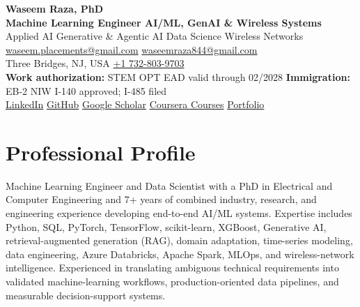 \documentclass[9pt,letterpaper]{extarticle}
\begin{document}
\begin{center}
{\LARGE\bfseries Waseem Raza, PhD}{\normalsize\mdseries }\\[2pt]
{\large\bfseries Machine Learning Engineer \textbar{} AI/ML, GenAI \& Wireless Systems}\\[1pt]
{\small Applied AI \textbar{} Generative \& Agentic AI \textbar{} Data Science \textbar{} Wireless Networks}\\[3pt]
{\footnotesize {}\enspace \href{mailto:waseem.placements@gmail.com}{waseem.placements@gmail.com} \textbar{} \href{mailto:waseemraza844@gmail.com}{waseemraza844@gmail.com}\\[1pt]Three Bridges, NJ, USA \quad {}\enspace \href{tel:+17328039703}{+1 732-803-9703}\\[1pt]{\scriptsize \textbf{Work authorization:} STEM OPT EAD valid through 02/2028 \textbar{} \textbf{Immigration:} EB-2 NIW I-140 approved; I-485 filed}\\[1pt]\href{https://www.linkedin.com/in/waseem-raza-phd-9a737858/}{LinkedIn} \textbar{} \href{https://github.com/WaseemRaza844}{GitHub} \textbar{} \href{https://scholar.google.com/citations?user=d58Drr0AAAAJ\&hl=en}{Google Scholar} \textbar{} \href{https://waseemraza844.github.io/portfolio/learning.html}{Coursera Courses} \textbar{} \href{https://waseemraza844.github.io/portfolio/}{Portfolio}}
\end{center}
\vspace{-5pt}
\section{Professional Profile}
Machine Learning Engineer and Data Scientist with a PhD in Electrical and Computer Engineering and 7+ years of combined industry, research, and engineering experience developing end-to-end AI/ML systems. Expertise includes Python, SQL, PyTorch, TensorFlow, scikit-learn, XGBoost, Generative AI, retrieval-augmented generation (RAG), domain adaptation, time-series modeling, data engineering, Azure Databricks, Apache Spark, MLOps, and wireless-network intelligence. Experienced in translating ambiguous technical requirements into validated machine-learning workflows, production-oriented data pipelines, and measurable decision-support systems.
\end{document}
